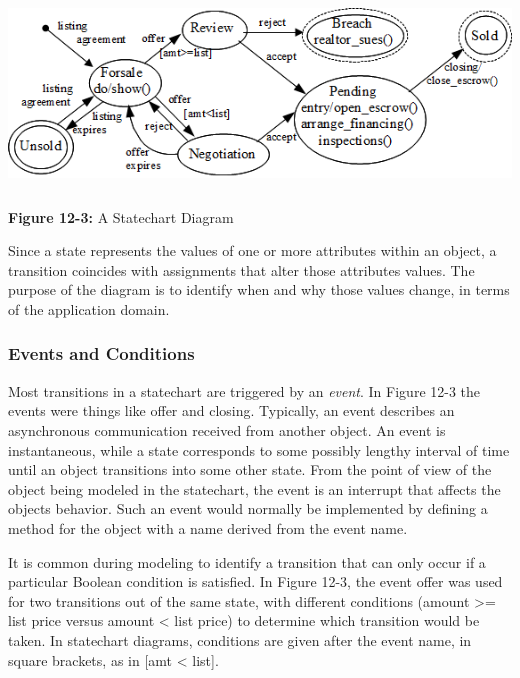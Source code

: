 \bigskip

\includegraphics[width=5.8in,height=2.0in]{ub-img/statechart.png}

{\sffamily\bfseries Figure 12-3:}
{\sffamily A Statechart Diagram}

\bigskip

Since a state represents the values of one or more attributes within an
object, a transition coincides with assignments that alter those
attributes{\textquotesingle} values. The purpose of the diagram is to
identify when and why those values change, in terms of the application
domain.

\subsubsection{Events and Conditions}

Most transitions in a statechart are triggered by an \textit{event}. In Figure 12-3 the events were things like
{\textquotedbl}offer{\textquotedbl} and
{\textquotedbl}closing.{\textquotedbl} Typically, an event describes an
asynchronous communication received from another object. An event is
instantaneous, while a state corresponds to some possibly lengthy
interval of time until an object transitions into some other state.
From the point of view of the object being modeled in the statechart,
the event is an interrupt that affects the object{\textquotesingle}s
behavior. Such an event would normally be implemented by defining a
method for the object with a name derived from the event name.

It is common during modeling to identify a transition that can only
occur if a particular Boolean condition is satisfied. In Figure 12-3,
the event offer was used for two transitions out of the same state,
with different conditions (amount {\textgreater}= list price versus
amount {\textless} list price) to determine which transition would be
taken. In statechart diagrams, conditions are given after the event
name, in square brackets, as in \textsf{[amt {\textless} list]}.

